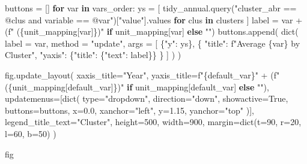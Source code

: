 \documentclass[
  letterpaper,
  DIV=11,
  numbers=noendperiod]{scrreprt}
\newenvironment{Shaded}{\begin{snugshade}}{\end{snugshade}}
\newcommand{\BuiltInTok}[1]{\textcolor[rgb]{0.00,0.23,0.31}{#1}}
\newcommand{\ControlFlowTok}[1]{\textcolor[rgb]{0.00,0.23,0.31}{\textbf{#1}}}
\newcommand{\DecValTok}[1]{\textcolor[rgb]{0.68,0.00,0.00}{#1}}
\newcommand{\FloatTok}[1]{\textcolor[rgb]{0.68,0.00,0.00}{#1}}
\newcommand{\KeywordTok}[1]{\textcolor[rgb]{0.00,0.23,0.31}{\textbf{#1}}}
\newcommand{\NormalTok}[1]{\textcolor[rgb]{0.00,0.23,0.31}{#1}}
\newcommand{\OperatorTok}[1]{\textcolor[rgb]{0.37,0.37,0.37}{#1}}
\newcommand{\SpecialCharTok}[1]{\textcolor[rgb]{0.37,0.37,0.37}{#1}}
\newcommand{\SpecialStringTok}[1]{\textcolor[rgb]{0.13,0.47,0.30}{#1}}
\newcommand{\StringTok}[1]{\textcolor[rgb]{0.13,0.47,0.30}{#1}}
\newcommand{\VariableTok}[1]{\textcolor[rgb]{0.07,0.07,0.07}{#1}}
\begin{document}
\begin{Shaded}
\begin{Highlighting}[]
\NormalTok{buttons }\OperatorTok{=}\NormalTok{ []}
\ControlFlowTok{for}\NormalTok{ var }\KeywordTok{in}\NormalTok{ vars\_order:}
\NormalTok{    ys }\OperatorTok{=}\NormalTok{ [}
\NormalTok{        tidy\_annual.query(}\StringTok{"cluster\_abr == @clus and variable == @var"}\NormalTok{)[}\StringTok{"value"}\NormalTok{].values}
        \ControlFlowTok{for}\NormalTok{ clus }\KeywordTok{in}\NormalTok{ clusters}
\NormalTok{    ]}
\NormalTok{    label }\OperatorTok{=}\NormalTok{ var }\OperatorTok{+}\NormalTok{ (}\SpecialStringTok{f" (}\SpecialCharTok{\{}\NormalTok{unit\_mapping[var]}\SpecialCharTok{\}}\SpecialStringTok{)"} \ControlFlowTok{if}\NormalTok{ unit\_mapping[var] }\ControlFlowTok{else} \StringTok{""}\NormalTok{)}
\NormalTok{    buttons.append(}
        \BuiltInTok{dict}\NormalTok{(}
\NormalTok{            label  }\OperatorTok{=}\NormalTok{ var,}
\NormalTok{            method }\OperatorTok{=} \StringTok{"update"}\NormalTok{,}
\NormalTok{            args   }\OperatorTok{=}\NormalTok{ [}
\NormalTok{                \{}\StringTok{"y"}\NormalTok{: ys\},}
\NormalTok{                \{}
                  \StringTok{"title"}\NormalTok{: }\SpecialStringTok{f"Average }\SpecialCharTok{\{}\NormalTok{var}\SpecialCharTok{\}}\SpecialStringTok{ by Cluster"}\NormalTok{,}
                  \StringTok{"yaxis"}\NormalTok{: \{}\StringTok{"title"}\NormalTok{: \{}\StringTok{"text"}\NormalTok{: label\}\}}
\NormalTok{                \}}
\NormalTok{            ]}
\NormalTok{        )}
\NormalTok{    )}

\NormalTok{fig.update\_layout(}
\NormalTok{    xaxis\_title}\OperatorTok{=}\StringTok{"Year"}\NormalTok{,}
\NormalTok{    yaxis\_title}\OperatorTok{=}\SpecialStringTok{f"}\SpecialCharTok{\{}\NormalTok{default\_var}\SpecialCharTok{\}}\SpecialStringTok{"} \OperatorTok{+}\NormalTok{ (}\SpecialStringTok{f" (}\SpecialCharTok{\{}\NormalTok{unit\_mapping[default\_var]}\SpecialCharTok{\}}\SpecialStringTok{)"} \ControlFlowTok{if}\NormalTok{ unit\_mapping[default\_var] }\ControlFlowTok{else} \StringTok{""}\NormalTok{),}
\NormalTok{    updatemenus}\OperatorTok{=}\NormalTok{[}\BuiltInTok{dict}\NormalTok{(}
        \BuiltInTok{type}\OperatorTok{=}\StringTok{"dropdown"}\NormalTok{,}
\NormalTok{        direction}\OperatorTok{=}\StringTok{"down"}\NormalTok{,}
\NormalTok{        showactive}\OperatorTok{=}\VariableTok{True}\NormalTok{,}
\NormalTok{        buttons}\OperatorTok{=}\NormalTok{buttons,}
\NormalTok{        x}\OperatorTok{=}\FloatTok{0.0}\NormalTok{, xanchor}\OperatorTok{=}\StringTok{"left"}\NormalTok{,}
\NormalTok{        y}\OperatorTok{=}\FloatTok{1.15}\NormalTok{, yanchor}\OperatorTok{=}\StringTok{"top"}
\NormalTok{    )],}
\NormalTok{    legend\_title\_text}\OperatorTok{=}\StringTok{"Cluster"}\NormalTok{,}
\NormalTok{    height}\OperatorTok{=}\DecValTok{500}\NormalTok{, width}\OperatorTok{=}\DecValTok{900}\NormalTok{,}
\NormalTok{    margin}\OperatorTok{=}\BuiltInTok{dict}\NormalTok{(t}\OperatorTok{=}\DecValTok{90}\NormalTok{, r}\OperatorTok{=}\DecValTok{20}\NormalTok{, l}\OperatorTok{=}\DecValTok{60}\NormalTok{, b}\OperatorTok{=}\DecValTok{50}\NormalTok{)}
\NormalTok{)}

\NormalTok{fig}
\end{Highlighting}
\end{Shaded}
\end{document}
